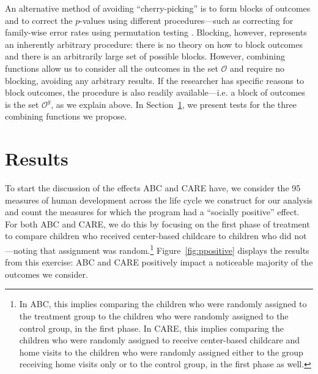 \noindent An alternative method of avoiding ``cherry-picking'' is to form blocks of outcomes and to correct the $p$-values using different procedures---such as correcting for family-wise error rates using permutation testing \citep{Lehmann_Romano_2005_testing,Romano_Shaikh_2006_AnnStat,Heckman_Moon_etal_2010_QE}. Blocking, however, represents an inherently arbitrary procedure: there is no theory on how to block outcomes and there is an arbitrarily large set of possible blocks. However, combining functions allow us to consider all the outcomes in the set $\mathcal{O}$ and require no blocking, avoiding any arbitrary results. If the researcher has specific reasons to block outcomes, the procedure is also readily available---i.e. a block of outcomes is the set $\mathcal{O}^g$, as we explain above. In Section~\ref{section:results}, we present tests for the three combining functions we propose.

\section{Results} \label{section:results}

\noindent To start the discussion of the effects ABC and CARE have, we consider the 95 measures of human development across the life cycle we construct for our analysis and count the measures for which the program had a ``socially positive'' effect. For both ABC and CARE, we do this by focusing on the first phase of treatment to compare children who received center-based childcare to children who did not---noting that assignment was random.\footnote{In ABC, this implies comparing the children who were randomly assigned to the treatment group to the children who were randomly assigned to the control group, in the first phase. In CARE, this implies comparing the children who were randomly assigned to receive center-based childcare and home visits to the children who were randomly assigned either to the group receiving home visits only or to the control group, in the first phase as well.} Figure~\ref{fig:ppositive} displays the results from this exercise: ABC and CARE positively impact a noticeable majority of the outcomes we consider.

